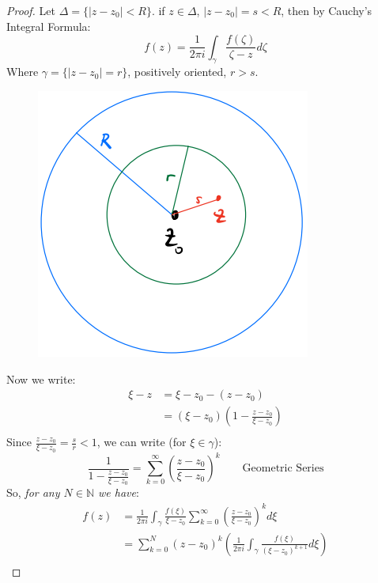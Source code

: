 \begin{proof}
    Let $\Delta = \{|z-z_0| < R\}$. if $z \in \Delta$, $|z - z_0| = s < R$, then by Cauchy's Integral Formula:
    \begin{equation}
        f(z) = \frac{1}{2\pi i} \int_{\gamma} \frac{f(\zeta)}{\zeta - z} d\zeta
    \end{equation}
    Where $\gamma = \{|z - z_0| = r\}$, positively oriented, $r > s$.\\
    \begin{figure}[H]
        \centering
        \includegraphics[scale=0.5]{LECTURE_8/proof.png}
    \end{figure}
    Now we write:
    \begin{align*}
        \xi - z & = \xi -z_0 - (z - z_0)                                   \\
                & = (\xi - z_0) \left(1 - \frac{z - z_0}{\xi - z_0}\right) \\
    \end{align*}
    Since $\frac{z - z_0}{\xi - z_0}  = \frac{s}{r} < 1$, we can write (for $\xi \in \gamma$):
    \begin{equation}
        \frac{1}{1 - \frac{z - z_0}{\xi - z_0}} = \sum_{k=0}^{\infty} \left(\frac{z - z_0}{\xi - z_0}\right)^k \qquad \text{Geometric Series}
    \end{equation}
    So, \textit{for any $N \in \mathbb{N}$ we have}:
    \begin{align*}
        f(z) & = \frac{1}{2\pi i} \int_{\gamma} \frac{f(\xi)}{\xi - z_0} \sum_{k=0}^{\infty} \left(\frac{z - z_0}{\xi - z_0}\right)^k d\xi                  \\
             & = \sum_{k=0}^{N} (z - z_0)^k \left(\frac{1}{2\pi i} \int_{\gamma} \frac{f(\xi)}{(\xi - z_0)^{k+1}} d\xi\right)                               \\

\end{align*}
\end{proof}

